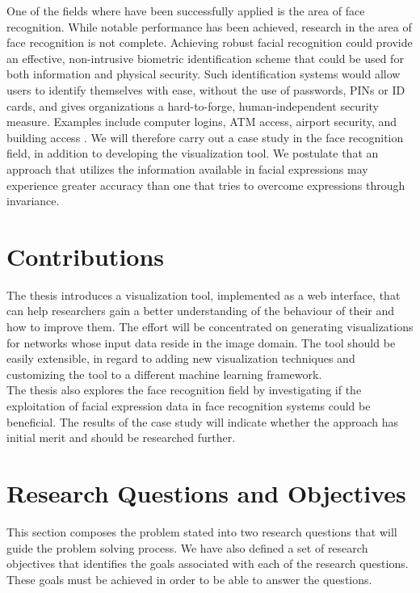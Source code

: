 \noindent One of the fields where  have been successfully applied is the area of face recognition. While notable performance has been achieved, research in the area of face recognition is not complete. Achieving robust facial recognition could provide an effective, non-intrusive biometric identification scheme that could be used for both information and physical security. Such identification systems would allow users to identify themselves with ease, without the use of passwords, PINs or ID cards, and gives organizations a hard-to-forge, human-independent security measure. Examples include computer logins, ATM access, airport security, and building access \cite{application-1, application-2, application-3}. We will therefore carry out a case study in the face recognition field, in addition to developing the visualization tool. We postulate that an approach that utilizes the information available in facial expressions may experience greater accuracy than one that tries to overcome expressions through invariance. \\


\section{Contributions}

The thesis introduces a visualization tool, implemented as a web interface, that can help researchers gain a better understanding of the behaviour of their  and how to improve them. The effort will be concentrated on generating visualizations for networks whose input data reside in the image domain. The tool should be easily extensible, in regard to adding new visualization techniques and customizing the tool to a different machine learning framework. \\

\noindent The thesis also explores the face recognition field by investigating if the exploitation of facial expression data in face recognition systems could be beneficial. The results of the case study will indicate whether the approach has initial merit and should be researched further.

\section{Research Questions and Objectives} \label{sec:research-questions}

This section composes the problem stated into two research questions that will guide the problem solving process. We have also defined a set of research objectives that identifies the goals associated with each of the research questions. These goals must be achieved in order to be able to answer the questions.

